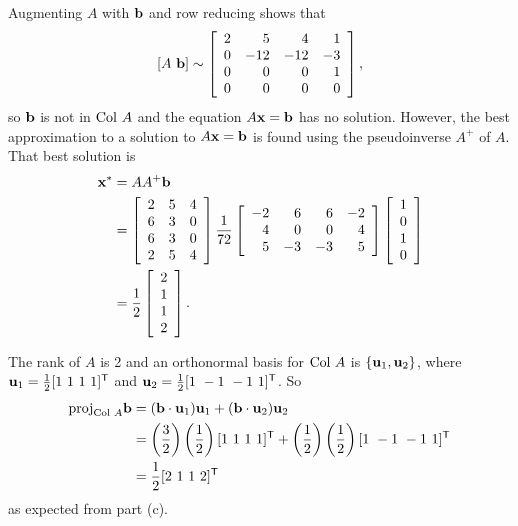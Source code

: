 \begin{example}
\item  Augmenting $A$ with $\mathbf{b}$ and row reducing shows that
\[[A \ \mathbf{b} ] \sim  \left[ \begin{array}{crrr} 2&5&4&1\\ 0&-12&-12&-3
\\ 0&0&0&1\\ 0&0&0&0\end {array}  \right],\]
so $\mathbf{b}$ is not in $\text{Col } A$ and the equation $A\mathbf{x} = \mathbf{b}$ has no solution. However, the best approximation to a solution to $A \mathbf{x} = \mathbf{b}$ is found using the pseudoinverse $A^+$ of $A$. That best solution is
\begin{align*}
\mathbf{x}^*&= AA^+ \mathbf{b} \\
	&= \left[ \begin{array}{ccc} 2&5&4\\6&3&0\\6&3&0\\2&5&4 \end{array} \right] \frac{1}{72} \left[ \begin{array}{rrrr} -2&6&6&-2 \\ 4&0&0&4 \\ 5&-3&-3&5 \end {array} \right] \left[ \begin{array}{c} 1\\0\\1\\0 \end{array} \right]  \\
	&= \frac{1}{2} \left[ \begin{array}{c} 2 \\ 1 \\ 1 \\ 2 \end{array} \right].
\end{align*}

\item  The rank of $A$ is 2 and an orthonormal basis for $\text{Col } A$ is $\{\mathbf{u}_1, \mathbf{u}_2\}$, where $\vu_1 = \frac{1}{2}[1 \ 1 \ 1 \ 1]^{\tr}$ and $\vu_2 = \frac{1}{2}[1 \ -1 \ -1 \ 1]^{\tr}$. So 
\begin{align*}
\proj_{\Col A} \vb &= (\vb \cdot \vu_1) \vu_1 + (\vb \cdot \vu_2) \vu_2 \\
	&= \left(\frac{3}{2}\right)\left(\frac{1}{2}\right)[1 \ 1 \ 1 \ 1]^{\tr} + \left(\frac{1}{2}\right)\left(\frac{1}{2}\right)[1 \ -1 \ -1 \ 1]^{\tr} \\
	&= \frac{1}{2}[2 \ 1 \ 1 \ 2]^{\tr}
\end{align*}
as expected from part (c). 

\ea

\end{example}

